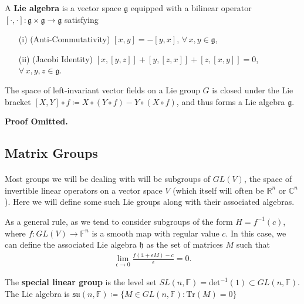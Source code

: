 \documentclass[11pt,fleqn]{article}
\renewenvironment{prop}{\begin{pBox}\begin{propT}}{\end{propT}\end{pBox}}
\begin{document}
\begin{definition}\label{def:LieAlgebra}
	A \textbf{Lie algebra} is a vector space $\mathfrak{g}$ equipped with a bilinear operator $[\cdot,\cdot] : \mathfrak{g} \times \mathfrak{g} \to \mathfrak{g}$ satisfying
		\begin{enumerate}
			\item[(i)] (Anti-Commutativity) $[x,y] = -[y,x]$, $\forall \, x,y \in \mathfrak{g}$,
			\item[(ii)] (Jacobi Identity) $[x,[y,z]] + [y,[z,x]] + [z,[x,y]] = 0$, $\forall \, x,y,z \in \mathfrak{g}$.
		\end{enumerate}
\end{definition}

\begin{prop}
	The space of left-invariant vector fields on a Lie group $G$ is closed under the Lie bracket $[X,Y]\circ f \coloneqq X\circ(Y\circ f) - Y \circ (X \circ f)$, and thus forms a Lie algebra $\mathfrak{g}$.
\end{prop}
\textbf{Proof Omitted.}

\subsection{Matrix Groups}

\paragraph{} Most groups we will be dealing with will be subgroups of $GL(V)$, the space of invertible linear operators on a vector space $V$ (which itself will often be $\mathbb{R}^n$ or $\mathbb{C}^n$). Here we will define some such Lie groups along with their associated algebras.

	\begin{remark}
	As a general rule, as we tend to consider subgroups of the form $H = f^{-1}(c)$, where $f : GL(V) \to \mathbb{F}^n$ is a smooth map with regular value $c$. In this case, we can define the associated Lie algebra $\mathfrak{h}$ as the set of matrices $M$ such that
		\begin{align}
			\lim_{\epsilon \to 0} \frac{
				f(\mathds{1} + \epsilon M) - c
			}{
				\epsilon
			} = 0.
		\end{align}
\end{remark}

\begin{example}
	The \textbf{special linear group} is the level set $ SL(n,\mathbb{F}) = \text{det}^{-1}(1) \subset GL(n, \mathbb{F})$. The Lie algebra is $\mathfrak{su}(n, \mathbb{F}) \coloneqq \{ M \in GL(n, \mathbb{F}) : \text{Tr}(M) = 0 \}$
\end{example}
\end{document}
